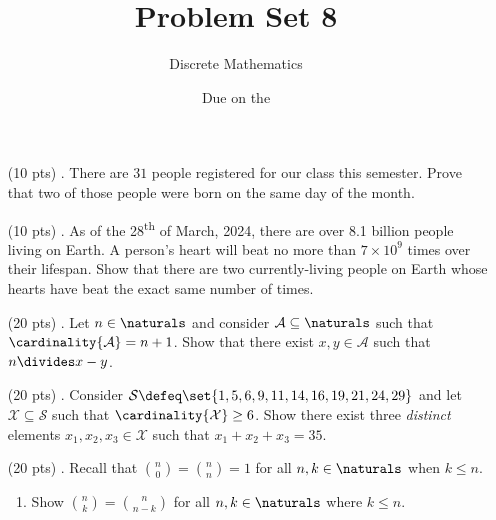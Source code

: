 

\title{Problem Set 8}
\author[Daniel Gonzalez Cedre]{Discrete Mathematics}
\date{Due on the }



\maketitle

\begin{enumerate}
  \item[(10 pts) \quad 1.]
    There are $31$ people registered for our class this semester.
    Prove that two of those people were born on the same day of the month.

  \item[(10 pts) \quad 2.]
    As of the 28\textsuperscript{th} of March, 2024, there are over 8.1 billion people living on Earth.%
    A person's heart will beat no more than $7 \times 10^9$ times over their lifespan.
    Show that there are two currently-living people on Earth whose hearts have beat the exact same number of times. 

  \item[(20 pts) \quad 3.]
    Let $n \in \naturals$ and consider $\mathcal{A} \subseteq \naturals$ such that $\cardinality{\mathcal{A}} = n + 1$.
    Show that there exist $x, y \in \mathcal{A}$ such that $n \divides x - y$.

  \item[(20 pts) \quad 4.]
    Consider $\mathcal{S} \defeq \set{1, 5, 6, 9, 11, 14, 16, 19, 21, 24, 29}$ and let $\mathcal{X} \subseteq \mathcal{S}$ such that $\cardinality{\mathcal{X}} \geq 6$.
    Show there exist three \emph{distinct} elements $x_1, x_2, x_3 \in \mathcal{X}$ such that $x_1 + x_2 + x_3 = 35$.

  \item[(20 pts) \quad 5.]
    Recall that $\binom{n}{0} = \binom{n}{n} = 1$ for all $n, k \in \naturals$ when $k \leq n$.
    \begin{enumerate}
      \item
        Show $\binom{n}{k} = \binom{n}{n - k}$ for all $n, k \in \naturals$ where $k \leq n$.


\end{enumerate}
\end{enumerate}

